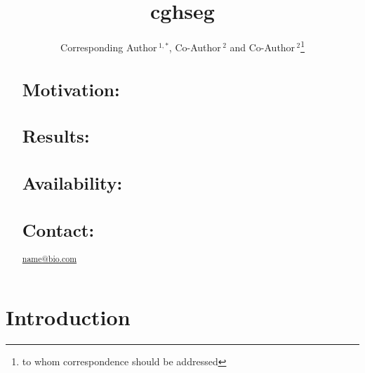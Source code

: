 \documentclass{bioinfo}
\begin{document}

\title[cghseg]{cghseg}
\author[Sample \textit{et~al}]{Corresponding Author\,$^{1,*}$, Co-Author\,$^{2}$ and Co-Author\,$^2$\footnote{to whom correspondence should be addressed}}
\address{$^{1}$Department of XXXXXXX, Address XXXX etc.\\
$^{2}$Department of XXXXXXXX, Address XXXX etc.}



\maketitle

\begin{abstract}

\section{Motivation:}
\section{Results:}
\section{Availability:}
\section{Contact:} \href{name@bio.com}{name@bio.com}
\end{abstract}

\section{Introduction}
\end{document}

